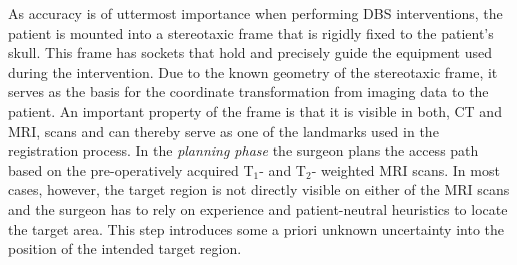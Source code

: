 \documentclass[review]{vgtc}                 %
\begin{document}
As accuracy is of uttermost importance when performing DBS interventions, the patient is mounted into a stereotaxic frame that is rigidly fixed to the patient's skull. This frame has sockets that hold and precisely guide the equipment used during the intervention. Due to the known geometry of the stereotaxic frame, it serves as the basis for the coordinate transformation from imaging data to the patient. An important property of the frame is that it is visible in both, CT and MRI, scans and can thereby serve as one of the landmarks used in the registration process. In the \emph{planning phase} the surgeon plans the access path based on the pre-operatively acquired T$_1$- and T$_2$- weighted MRI scans. In most cases, however, the target region is not directly visible on either of the MRI scans and the surgeon has to rely on experience and patient-neutral heuristics to locate the target area. This step introduces some a priori unknown uncertainty into the position of the intended target region. %

\end{document}
